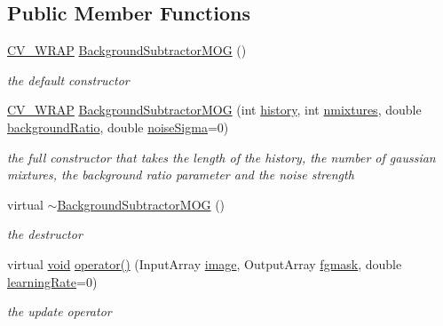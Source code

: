 \subsection*{Public Member Functions}
\begin{DoxyCompactItemize}
\item 
\hyperlink{core_2types__c_8h_ae435babf3ce7cca990524b23adf6b4a3}{C\-V\-\_\-\-W\-R\-A\-P} \hyperlink{classcv_1_1BackgroundSubtractorMOG_af09965a3ea5e7e55cc01a4c61e6de997}{Background\-Subtractor\-M\-O\-G} ()
\begin{DoxyCompactList}\small\item\em the default constructor \end{DoxyCompactList}\item 
\hyperlink{core_2types__c_8h_ae435babf3ce7cca990524b23adf6b4a3}{C\-V\-\_\-\-W\-R\-A\-P} \hyperlink{classcv_1_1BackgroundSubtractorMOG_a82a675f595baba64cfae48c7d991e0da}{Background\-Subtractor\-M\-O\-G} (int \hyperlink{classcv_1_1BackgroundSubtractorMOG_aa5250ac6323aa290271de50b0eca1660}{history}, int \hyperlink{classcv_1_1BackgroundSubtractorMOG_a3df74a7b99c0a299eae9e46942a5c9a2}{nmixtures}, double \hyperlink{classcv_1_1BackgroundSubtractorMOG_a0a64ad8542c52c2638d4b61038d5f5e3}{background\-Ratio}, double \hyperlink{classcv_1_1BackgroundSubtractorMOG_a5e8fee996d73bd3944a2ff27ff89519b}{noise\-Sigma}=0)
\begin{DoxyCompactList}\small\item\em the full constructor that takes the length of the history, the number of gaussian mixtures, the background ratio parameter and the noise strength \end{DoxyCompactList}\item 
virtual \hyperlink{classcv_1_1BackgroundSubtractorMOG_a24f7a7b0dbb5be3bb6353e5e5b029533}{$\sim$\-Background\-Subtractor\-M\-O\-G} ()
\begin{DoxyCompactList}\small\item\em the destructor \end{DoxyCompactList}\item 
virtual \hyperlink{legacy_8hpp_a8bb47f092d473522721002c86c13b94e}{void} \hyperlink{classcv_1_1BackgroundSubtractorMOG_a65a3aa8d9ee2f5fd83454694ea49b56f}{operator()} (Input\-Array \hyperlink{legacy_8hpp_ad62b16ab219ae2483e8a3d921c44cc97}{image}, Output\-Array \hyperlink{classcv_1_1BackgroundSubtractor_a3a04333e20f88e6799f368d7abb2abd9}{fgmask}, double \hyperlink{classcv_1_1BackgroundSubtractor_a98797ef02141e31b050f1ed6259fd229}{learning\-Rate}=0)
\begin{DoxyCompactList}\small\item\em the update operator \end{DoxyCompactList}\item 

\end{DoxyCompactItemize}
